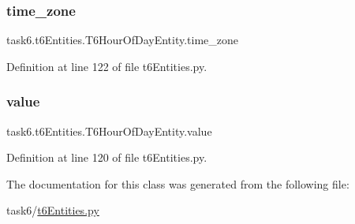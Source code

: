 \subsubsection{\texorpdfstring{time\+\_\+zone}{time\_zone}}
{\footnotesize\ttfamily task6.\+t6\+Entities.\+T6\+Hour\+Of\+Day\+Entity.\+time\+\_\+zone}



Definition at line 122 of file t6\+Entities.\+py.

\mbox{\label{classtask6_1_1t6Entities_1_1T6HourOfDayEntity_aca30067d70324692cc16ad71cc422dec}} 
\subsubsection{\texorpdfstring{value}{value}}
{\footnotesize\ttfamily task6.\+t6\+Entities.\+T6\+Hour\+Of\+Day\+Entity.\+value}



Definition at line 120 of file t6\+Entities.\+py.



The documentation for this class was generated from the following file\+:\begin{DoxyCompactItemize}
\item 
task6/\hyperlink{t6Entities_8py}{t6\+Entities.\+py}\end{DoxyCompactItemize}
